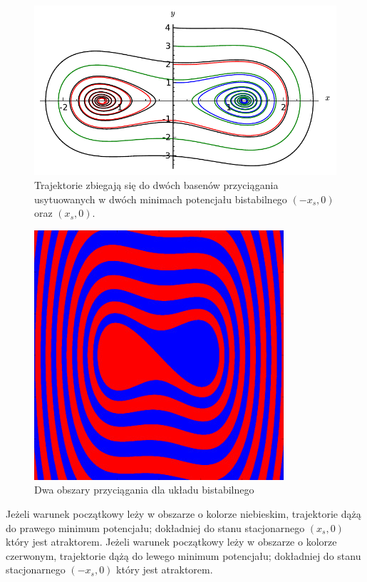 \documentclass[a4paper,12pt,polish]{sphinxmanual}
\begin{document}
\begin{figure}[htbp]
\centering
\capstart

\includegraphics{sage_chI024_02.pdf}
\caption{Trajektorie zbiegają się do dwóch basenów przyciągania
usytuowanych w dwóch minimach potencjału bistabilnego
$(-x_s, 0)$ oraz $(x_s, 0)$.}\end{figure}
\begin{figure}[htbp]
\centering
\capstart

\includegraphics{baseny_bistabilny.jpg}
\caption{Dwa obszary przyciągania dla układu bistabilnego}\end{figure}

Jeżeli warunek początkowy leży w obszarze o kolorze niebieskim, trajektorie dążą do prawego
minimum potencjału; dokładniej do stanu stacjonarnego $(x_s,0)$ który jest atraktorem.
Jeżeli warunek początkowy leży w obszarze o kolorze czerwonym, trajektorie dążą do lewego
minimum potencjału; dokładniej do stanu stacjonarnego $(-x_s,0)$ który jest atraktorem.
\end{document}

